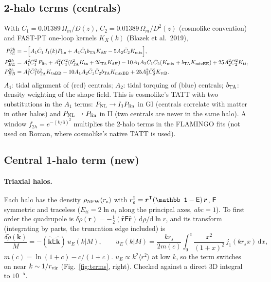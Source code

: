 \documentclass[11pt]{article}
\newcommand{\PNL}{P_{\rm NL}}
\newcommand{\Plin}{P_{\rm lin}}
\newcommand{\bTA}{b_{\rm TA}}
\newcommand{\dd}{\mathrm{d}}
\begin{document}
\subsection{2-halo terms (centrals)}
With $\bar C_1 = 0.01389\,\Omega_m/D(z)$, $\bar C_2 = 0.01389\,\Omega_m/D^2(z)$
(cosmolike convention) and FAST-PT one-loop kernels $K_X(k)$ (Blazek et al.\ 2019),
\begin{align}
P^{2h}_{\delta E} &= -\Big[A_1\bar C_1\,I_1(k)\Plin + A_1\bar C_1\bTA K_{\delta E} - 5A_2\bar C_2 K_{\rm mix}\Big],\label{eq:gi2h}\\
P^{2h}_{EE} &= A_1^2\bar C_1^2\,\Plin + A_1^2\bar C_1^2(\bTA^2 K_{\rm ta} + 2\bTA K_{\delta E})
 - 10A_1A_2\bar C_1\bar C_2(K_{\rm mix} + \bTA K_{\rm mixEE}) + 25A_2^2\bar C_2^2K_{\rm tt},\label{eq:ii2h}\\
P^{2h}_{BB} &= A_1^2\bar C_1^2\bTA^2 K_{\rm taBB} - 10A_1A_2\bar C_1\bar C_2\bTA K_{\rm mixBB} + 25A_2^2\bar C_2^2 K_{\rm ttB}.
\end{align}
$A_1$: tidal alignment of (red) centrals; $A_2$: tidal torquing of (blue)
centrals; $\bTA$: density weighting of the shape field. This is cosmolike's TATT
with two substitutions in the $A_1$ terms: $\PNL \to I_1\Plin$ in GI (centrals
correlate with matter in other halos) and $\PNL \to \Plin$ in II (two centrals
are never in the same halo). A window $f_{2h} = e^{-(k/6)^2}$ multiplies the 2-halo
terms in the FLAMINGO fits (not used on Roman, where cosmolike's native TATT
is used).

\subsection{Central 1-halo term (new)}
\paragraph{Triaxial halos.} Each halo has the density $\rho_{\rm NFW}(r_e)$ with
$r_e^2 = \bm r^{\sf T}(\mathbb 1 - \mathsf E)\,\bm r$, $\mathsf E$ symmetric and
traceless ($E_{ii} = 2\ln a_i$ along the principal axes, $abc = 1$). To first order
the quadrupole is
$\delta\rho(\bm r) = -\tfrac12(\hat{\bm r}\mathsf E\hat{\bm r})\,\dd\rho/\dd\ln r$,
and its transform (integrating by parts, the truncation edge included) is
\begin{equation}
\frac{\delta\tilde\rho(\bm k)}{M} = -(\hat{\bm k}\mathsf E\hat{\bm k})\,u_E(k|M),\qquad
u_E(k|M) = \frac{k r_s}{2m(c)}\int_0^c \frac{x^2}{(1+x)^2}\,j_1(k r_s x)\,\dd x ,
\label{eq:uE}
\end{equation}
$m(c) = \ln(1+c) - c/(1+c)$. $u_E \propto k^2\langle r^2\rangle$ at low $k$, so the
term switches on near $k \sim 1/r_{\rm vir}$ (Fig.~\ref{fig:terms}, right).
Checked against a direct 3D integral to $10^{-5}$.
\end{document}
